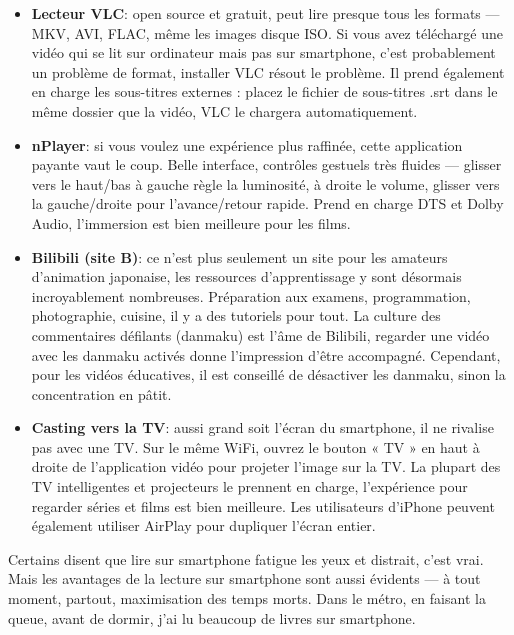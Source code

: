 \begin{itemize}
  \item \textbf{Lecteur VLC}: open source et gratuit, peut lire presque tous les formats — MKV, AVI, FLAC, même les images disque ISO. Si vous avez téléchargé une vidéo qui se lit sur ordinateur mais pas sur smartphone, c'est probablement un problème de format, installer VLC résout le problème. Il prend également en charge les sous-titres externes : placez le fichier de sous-titres .srt dans le même dossier que la vidéo, VLC le chargera automatiquement.
  \item \textbf{nPlayer}: si vous voulez une expérience plus raffinée, cette application payante vaut le coup. Belle interface, contrôles gestuels très fluides — glisser vers le haut/bas à gauche règle la luminosité, à droite le volume, glisser vers la gauche/droite pour l'avance/retour rapide. Prend en charge DTS et Dolby Audio, l'immersion est bien meilleure pour les films.
  \item \textbf{Bilibili (site B)}: ce n'est plus seulement un site pour les amateurs d'animation japonaise, les ressources d'apprentissage y sont désormais incroyablement nombreuses. Préparation aux examens, programmation, photographie, cuisine, il y a des tutoriels pour tout. La culture des commentaires défilants (danmaku) est l'âme de Bilibili, regarder une vidéo avec les danmaku activés donne l'impression d'être accompagné. Cependant, pour les vidéos éducatives, il est conseillé de désactiver les danmaku, sinon la concentration en pâtit.
  \item \textbf{Casting vers la TV}: aussi grand soit l'écran du smartphone, il ne rivalise pas avec une TV. Sur le même WiFi, ouvrez le bouton « TV » en haut à droite de l'application vidéo pour projeter l'image sur la TV. La plupart des TV intelligentes et projecteurs le prennent en charge, l'expérience pour regarder séries et films est bien meilleure. Les utilisateurs d'iPhone peuvent également utiliser AirPlay pour dupliquer l'écran entier.
\end{itemize}


Certains disent que lire sur smartphone fatigue les yeux et distrait, c'est vrai. Mais les avantages de la lecture sur smartphone sont aussi évidents — à tout moment, partout, maximisation des temps morts. Dans le métro, en faisant la queue, avant de dormir, j'ai lu beaucoup de livres sur smartphone.


